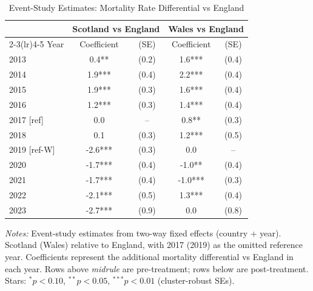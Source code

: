 \begin{table}[htbp]
\centering
\caption{Event-Study Estimates: Mortality Rate Differential vs England}
\label{tab:event_study}
\small
\begin{tabular}{lcccc}
\toprule
 & \multicolumn{2}{c}{Scotland vs England} & \multicolumn{2}{c}{Wales vs England} \\
\cmidrule(lr){2-3}\cmidrule(lr){4-5}
Year & Coefficient & (SE) & Coefficient & (SE) \\
\midrule
2013 & 0.4** & (0.2) & 1.6*** & (0.4) \\
2014 & 1.9*** & (0.4) & 2.2*** & (0.4) \\
2015 & 1.9*** & (0.3) & 1.6*** & (0.4) \\
2016 & 1.2*** & (0.3) & 1.4*** & (0.4) \\
\midrule
2017 [ref] & 0.0 & -- & 0.8** & (0.3) \\
2018 & 0.1 & (0.3) & 1.2*** & (0.5) \\
\midrule
2019 [ref-W] & -2.6*** & (0.3) & 0.0 & -- \\
2020 & -1.7*** & (0.4) & -1.0** & (0.4) \\
2021 & -1.7*** & (0.4) & -1.0*** & (0.3) \\
2022 & -2.1*** & (0.5) & 1.3*** & (0.4) \\
2023 & -2.7*** & (0.9) & 0.0 & (0.8) \\
\bottomrule
\end{tabular}
\begin{tablenotes}
\small
\item \textit{Notes:} Event-study estimates from two-way fixed effects (country + year). 
Scotland (Wales) relative to England, with 2017 (2019) as the omitted reference year. 
Coefficients represent the additional mortality differential vs England in each year. 
Rows above \textit{midrule} are pre-treatment; rows below are post-treatment. 
Stars: ${}^{*}p<0.10$, ${}^{**}p<0.05$, ${}^{***}p<0.01$ (cluster-robust SEs).
\end{tablenotes}
\end{table}

